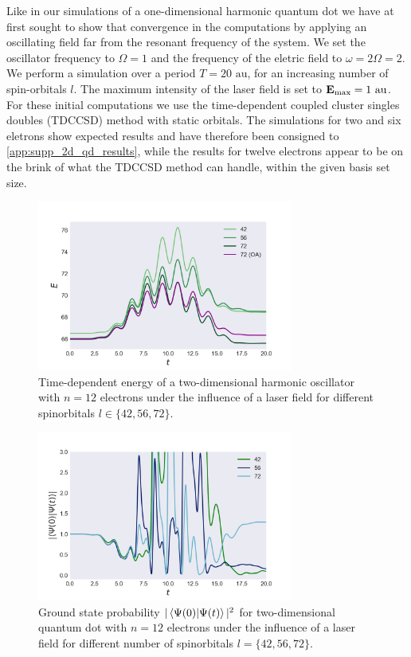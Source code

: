 Like in our simulations of a one-dimensional harmonic quantum dot we have at first 
sought to show that convergence in the computations by applying an oscillating 
field far from the resonant frequency of the system. We set the oscillator frequency 
to $\Omega=1$ and the frequency of the eletric field to $\omega=2\Omega=2$. We 
perform a simulation over a period $T = 20 \text{ au}$, for an increasing 
number of spin-orbitals $l$. The maximum intensity of the laser field is set to 
$\vb{E}_\text{max} = 1 \text{ au}$. For these initial computations we use the 
time-dependent coupled cluster singles doubles (TDCCSD) method with static 
orbitals. The simulations for two and six eletrons show expected results and have
therefore been consigned to \autoref{app:supp_2d_qd_results}, while the results for
twelve electrons appear to be on the brink of what the TDCCSD method 
can handle, within the given basis set size.

\begin{figure}
    \centering
    \includegraphics[width=0.75\textwidth]{results/figures/2D/n12_energy.png} 
    \caption{Time-dependent energy of a two-dimensional harmonic oscillator 
        with $n=12$ electrons under the influence of a laser field for different 
        spinorbitals $l\in\{42,56,72\}$.
    }
    \label{fig:n12_2d_energy}
\end{figure}

\begin{figure}
    \centering
    \includegraphics[width=0.75\textwidth]{results/figures/2D/n12_overlap.png} 
    \caption{Ground state probability $|\braket{\Psi(0)}{\Psi(t)}|^2$ for two-dimensional
        quantum dot with $n=12$ electrons under the influence of a laser field for 
        different number of spinorbitals $l=\{42,56,72\}$. 
    }
    \label{fig:n12_2d_overlap}
\end{figure}

